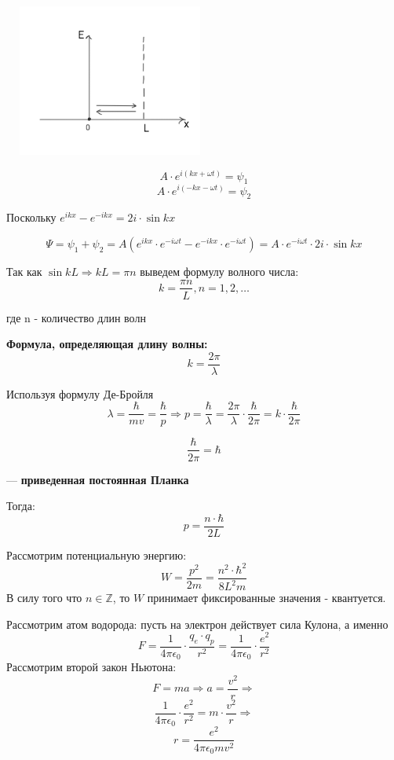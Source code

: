 \documentclass[../main.tex]{subfiles}
\begin{document}
\begin{center}
    \includegraphics[height=5cm, width=7cm]{../img/kvantovy15.png}
\end{center}

\[A \cdot e^{i(kx+ \omega t)} = \psi_1\]
\[A \cdot e^{i(-kx - \omega t)} = \psi_2\]

Поскольку $e^{ikx} - e^{-ikx} = 2i \cdot \sin{kx}$

\[\Psi = \psi_1 + \psi_2 = A(e^{ikx} \cdot e^{-i \omega t} - e^{- ikx} \cdot e^{-i \omega t}) = A \cdot e^{-i \omega t} \cdot 2i \cdot \sin{kx} \]

Так как $\sin{kL} \Rightarrow kL = \pi n$ выведем формулу волного числа:
\[k = \frac{\pi n}{L} , n = 1, 2, \ldots\]
\begin{center}
    где n - количество длин волн
\end{center}

\textbf{Формула, определяющая длину волны:}
\[k = \frac{2 \pi}{\lambda}\]

Используя формулу Де-Бройля 
\[\lambda = \frac{\hbar}{mv} = \frac{\hbar}{p} \Rightarrow p = \frac{\hbar}{\lambda} = \frac{2 \pi}{\lambda} \cdot \frac{\hbar}{2 \pi} = k\cdot \frac{\hbar}{2 \pi}\]

\[\frac{\hbar}{2 \pi} = \hbar\]
\begin{center}
    --- \textbf{приведенная постоянная Планка}
\end{center}

Тогда:
\[p = \frac{n \cdot \hbar}{2 L}\]

Рассмотрим потенциальную энергию:
\[W = \frac{p^2}{2 m} = \frac{n^2 \cdot \hbar^2}{8L^2 m}\]
В силу того что $n \in \mathbb{Z}$, то $W$ принимает фиксированные значения - квантуется.

Рассмотрим атом водорода: пусть на электрон действует сила Кулона, а именно
\[F = \frac{1}{4 \pi \epsilon_0} \cdot \frac{q_e \cdot q_p}{r^2} = \frac{1}{4 \pi \epsilon_0} \cdot \frac{e^2}{r^2}\]
Рассмотрим второй закон Ньютона:
\[F = ma \Rightarrow a = \frac{v^2}{r} \Rightarrow\]
\[\frac{1}{4 \pi \epsilon_0} \cdot \frac{e^2}{r^2} = m \cdot \frac{v^2}{r} \Rightarrow\]
\begin{equation} \label{eq:r}
    r = \frac{e^2}{4 \pi \epsilon_0 m v^2}
\end{equation}
\end{document}
